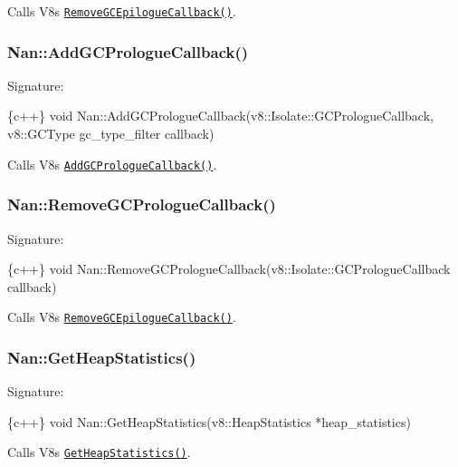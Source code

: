 Calls V8\textquotesingle{}s \href{https://v8docs.nodesource.com/io.js-3.0/d5/dda/classv8_1_1_isolate.html#a05c60859fd4b8e96bfcd451281ed6c7c}{\tt {\ttfamily Remove\+G\+C\+Epilogue\+Callback()}}.

\label{_api_nan_add_gc_prologue_callback}%
 \subsubsection*{Nan\+::\+Add\+G\+C\+Prologue\+Callback()}

Signature\+:


\begin{DoxyCode}
\{c++\}
void Nan::AddGCPrologueCallback(v8::Isolate::GCPrologueCallback, v8::GCType gc\_type\_filter callback)
\end{DoxyCode}


Calls V8\textquotesingle{}s \href{https://v8docs.nodesource.com/io.js-3.0/d5/dda/classv8_1_1_isolate.html#ab4b87b8f9f8e5bf95eba4009357e001f}{\tt {\ttfamily Add\+G\+C\+Prologue\+Callback()}}.

\label{_api_nan_remove_gc_prologue_callback}%
 \subsubsection*{Nan\+::\+Remove\+G\+C\+Prologue\+Callback()}

Signature\+:


\begin{DoxyCode}
\{c++\}
void Nan::RemoveGCPrologueCallback(v8::Isolate::GCPrologueCallback callback)
\end{DoxyCode}


Calls V8\textquotesingle{}s \href{https://v8docs.nodesource.com/io.js-3.0/d5/dda/classv8_1_1_isolate.html#a9f6c51932811593f81ff30b949124186}{\tt {\ttfamily Remove\+G\+C\+Epilogue\+Callback()}}.

\label{_api_nan_get_heap_statistics}%
 \subsubsection*{Nan\+::\+Get\+Heap\+Statistics()}

Signature\+:


\begin{DoxyCode}
\{c++\}
void Nan::GetHeapStatistics(v8::HeapStatistics *heap\_statistics)
\end{DoxyCode}


Calls V8\textquotesingle{}s \href{https://v8docs.nodesource.com/io.js-3.0/d5/dda/classv8_1_1_isolate.html#a5593ac74687b713095c38987e5950b34}{\tt {\ttfamily Get\+Heap\+Statistics()}}.

